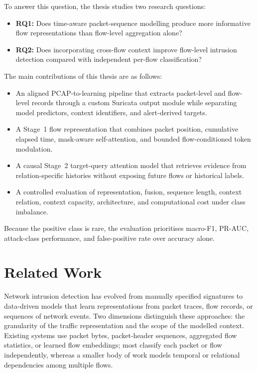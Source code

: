 \documentclass[11pt,fleqn]{report}
\begin{document}
To answer this question, the thesis studies two research questions:

\begin{itemize}
    \item \textbf{RQ1:} Does time-aware packet-sequence modelling produce more informative flow representations than flow-level aggregation alone?
    \item \textbf{RQ2:} Does incorporating cross-flow context improve flow-level intrusion detection compared with independent per-flow classification?
\end{itemize}

The main contributions of this thesis are as follows:

\begin{itemize}
    \item An aligned PCAP-to-learning pipeline that extracts packet-level and flow-level records through a custom Suricata output module while separating model predictors, context identifiers, and alert-derived targets.
    \item A Stage~1 flow representation that combines packet position, cumulative elapsed time, mask-aware self-attention, and bounded flow-conditioned token modulation.
    \item A causal Stage~2 target-query attention model that retrieves evidence from relation-specific histories without exposing future flows or historical labels.
    \item A controlled evaluation of representation, fusion, sequence length, context relation, context capacity, architecture, and computational cost under class imbalance.
\end{itemize}

Because the positive class is rare, the evaluation prioritises macro-F1, PR-AUC, attack-class performance, and false-positive rate over accuracy alone.

\chapter{Related Work}
\label{sec:related_work}

Network intrusion detection has evolved from manually specified signatures to data-driven models that learn representations from packet traces, flow records, or sequences of network events. Two dimensions distinguish these approaches: the granularity of the traffic representation and the scope of the modelled context. Existing systems use packet bytes, packet-header sequences, aggregated flow statistics, or learned flow embeddings; most classify each packet or flow independently, whereas a smaller body of work models temporal or relational dependencies among multiple flows.
\end{document}
